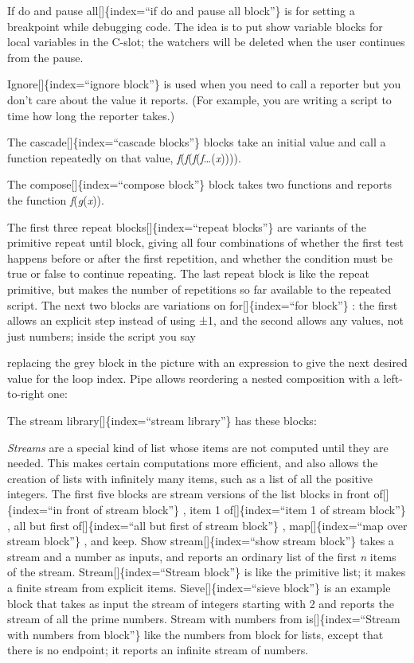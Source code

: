 \documentclass[
  letterpaper,
]{book}
\begin{document}
If do and pause all{[}{]}\{index=``if do and pause all block''\} is for
setting a breakpoint while debugging code. The idea is to put show
variable blocks for local variables in the C-slot; the watchers will be
deleted when the user continues from the pause.

Ignore{[}{]}\{index=``ignore block''\} is used when you need to call a
reporter but you don't care about the value it reports. (For example,
you are writing a script to time how long the reporter takes.)

The cascade{[}{]}\{index=``cascade blocks''\} blocks take an initial
value and call a function repeatedly on that value,
\emph{f}(\emph{f}(\emph{f}(\emph{f}\ldots(\emph{x})))).

The compose{[}{]}\{index=``compose block''\} block takes two functions
and reports the function \emph{f}(\emph{g}(\emph{x})).

The first three repeat blocks{[}{]}\{index=``repeat blocks''\} are
variants of the primitive repeat until block, giving all four
combinations of whether the first test happens before or after the first
repetition, and whether the condition must be true or false to continue
repeating. The last repeat block is like the repeat primitive, but makes
the number of repetitions so far available to the repeated script. The
next two blocks are variations on for{[}{]}\{index=``for block''\} : the
first allows an explicit step instead of using ±1, and the second allows
any values, not just numbers; inside the script you say

replacing the grey block in the picture with an expression to give the
next desired value for the loop index. Pipe allows reordering a nested
composition with a left-to-right one:

The stream library{[}{]}\{index=``stream library''\} has these blocks:

\emph{Streams} are a special kind of list whose items are not computed
until they are needed. This makes certain computations more efficient,
and also allows the creation of lists with infinitely many items, such
as a list of all the positive integers. The first five blocks are stream
versions of the list blocks in front of{[}{]}\{index=``in front of
stream block''\} , item 1 of{[}{]}\{index=``item 1 of stream block''\} ,
all but first of{[}{]}\{index=``all but first of stream block''\} ,
map{[}{]}\{index=``map over stream block''\} , and keep. Show
stream{[}{]}\{index=``show stream block''\} takes a stream and a number
as inputs, and reports an ordinary list of the first \emph{n} items of
the stream. Stream{[}{]}\{index=``Stream block''\} is like the primitive
list; it makes a finite stream from explicit items.
Sieve{[}{]}\{index=``sieve block''\} is an example block that takes as
input the stream of integers starting with 2 and reports the stream of
all the prime numbers. Stream with numbers from is{[}{]}\{index=``Stream
with numbers from block''\} like the numbers from block for lists,
except that there is no endpoint; it reports an infinite stream of
numbers.
\end{document}
